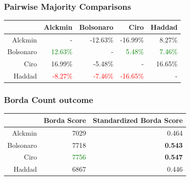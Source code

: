 \documentclass[xcolor={svgnames}]{beamer}
\begin{document}
\begin{frame}
  \frametitle{ Pairwise Majority Comparisons}

\begin{table}[!h]
\centering
\begin{tabular}{rrrrr} & Alckmin & Bolsonaro & Ciro & Haddad \\\hline Alckmin &
  - & -12.63\% & -16.99\% & 8.27\% \\ Bolsonaro & \textcolor{green}{12.63\%} & -
  & \textcolor{green}{5.48\%} & \textcolor{green}{7.46\%} \\ Ciro & 16.99\% &
  -5.48\% & - & 16.65\% \\ Haddad & \textcolor{red}{-8.27\%} &
  \textcolor{red}{-7.46\%} & \textcolor{red}{-16.65\%} & - \\\hline

\end{tabular}
\end{table}

\end{frame}

\begin{frame}
  \frametitle{Borda Count outcome }

\begin{table}[!h]
\centering
          \begin{tabular}{rrr} \hline & Borda Score & Standardized Borda Score\\
            \hline
            Alckmin & 7029 & 0.464 \\ Bolsonaro & 7718 & \textbf{0.543} \\ Ciro & \textcolor{green}{7756} & \textbf{0.547}\\
            Haddad & 6867 & 0.446 \\ \hline
\end{tabular}
\end{table}
\end{frame}
\end{document}
